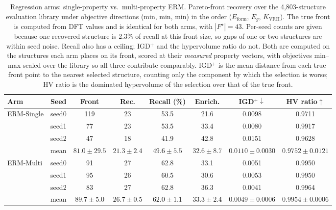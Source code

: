 \begin{table}[htbp]
\renewcommand{\arraystretch}{1.2}
\setlength{\tabcolsep}{4pt}
\caption{Regression arms: single-property vs.\ multi-property ERM. Pareto-front recovery over the 4{,}803-structure evaluation library under objective directions (min, min, min) in the order ($E_\mathrm{form}$, $E_g$, $K_\mathrm{VRH}$). The true front is computed from DFT values and is identical for both arms, with $|F^\star|{=}43$. Per-seed counts are given because one recovered structure is 2.3\% of recall at this front size, so gaps of one or two structures are within seed noise. Recall also has a ceiling; IGD$^+$ and the hypervolume ratio do not. Both are computed on the structures each arm places on its front, scored at their \emph{measured} property vectors, with objectives min--max scaled over the library so all three contribute comparably. IGD$^+$ is the mean distance from each true-front point to the nearest selected structure, counting only the component by which the selection is worse; HV ratio is the dominated hypervolume of the selection over that of the true front.}
\label{tab:pareto_arms_erm_heldout}
\centering
\footnotesize
\begin{tabular}{@{}llcccccc@{}}
\hline\hline
\textbf{Arm} & \textbf{Seed} & \textbf{Front} & \textbf{Rec.} & \textbf{Recall (\%)} & \textbf{Enrich.} & \textbf{IGD$^+\downarrow$} & \textbf{HV ratio$\uparrow$} \\
\hline
\multirow{4}{*}{ERM-Single}
  & seed0 & 119 & 23 & 53.5 & 21.6 & 0.0098 & 0.9711 \\
  & seed1 & 77 & 23 & 53.5 & 33.4 & 0.0080 & 0.9917 \\
  & seed2 & 47 & 18 & 41.9 & 42.8 & 0.0151 & 0.9628 \\
  & mean & $81.0 \pm 29.5$ & $21.3 \pm 2.4$ & $49.6 \pm 5.5$ & $32.6 \pm 8.7$ & $0.0110 \pm 0.0030$ & $0.9752 \pm 0.0121$ \\
\hline
\multirow{4}{*}{ERM-Multi}
  & seed0 & 91 & 27 & 62.8 & 33.1 & 0.0051 & 0.9950 \\
  & seed1 & 95 & 26 & 60.5 & 30.6 & 0.0053 & 0.9950 \\
  & seed2 & 83 & 27 & 62.8 & 36.3 & 0.0041 & 0.9964 \\
  & mean & $89.7 \pm 5.0$ & $26.7 \pm 0.5$ & $62.0 \pm 1.1$ & $33.3 \pm 2.4$ & $0.0049 \pm 0.0006$ & $0.9954 \pm 0.0006$ \\
\hline\hline
\end{tabular}
\end{table}
